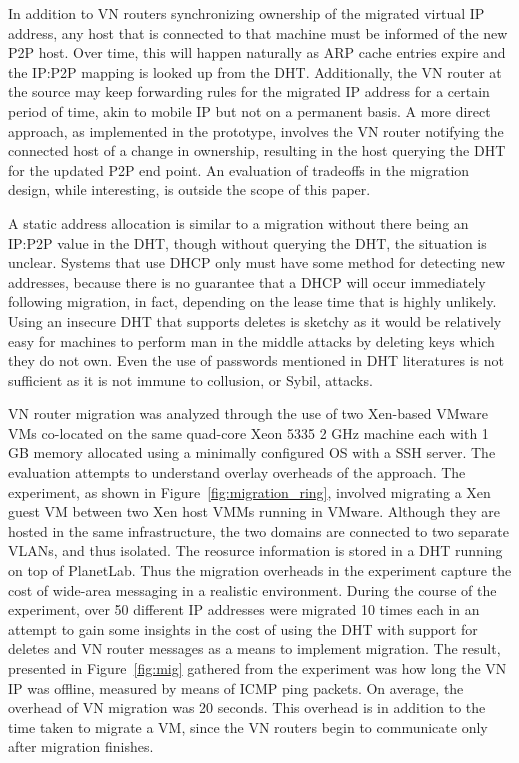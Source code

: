 In addition to VN routers synchronizing ownership of the migrated virtual
IP address, any host that is connected to that machine must be informed
of the new P2P host.  Over time, this will happen naturally as ARP cache
entries expire and the IP:P2P mapping is looked up from the DHT.  Additionally,
the VN router at the source may keep forwarding rules for the migrated IP
address for a certain period of time, akin to mobile IP but not on a permanent
basis.  A more direct approach, as implemented in the prototype, involves the VN
router notifying the connected host of a change in ownership, resulting in the
host querying the DHT for the updated P2P end point.  An evaluation of tradeoffs
in the migration design, while interesting, is outside the scope of this paper. 

A static address allocation is similar to a migration without there being an
IP:P2P value in the DHT, though without querying the DHT, the situation is
unclear.  Systems that use DHCP only must have some method for detecting new
addresses, because there is no guarantee that a DHCP will occur immediately
following migration, in fact, depending on the lease time that is highly
unlikely.  Using an insecure DHT that supports deletes is sketchy as it would
be relatively easy for machines to perform man in the middle attacks by
deleting keys which they do not own.  Even the use of passwords mentioned in
DHT literatures is not sufficient as it is not immune to collusion, or Sybil,
attacks.

VN router migration was analyzed through the use of two Xen-based VMware VMs
co-located on the same quad-core Xeon 5335 2 GHz machine each with 1 GB memory
allocated using a minimally configured OS with a SSH server.  The evaluation
attempts to understand overlay overheads of the approach.  The experiment, as
shown in Figure~\ref{fig:migration_ring}, involved migrating a Xen guest VM
between two Xen host VMMs running in VMware.  Although they are hosted in the
same infrastructure, the two domains are connected to two separate VLANs, and
thus isolated.  The reosurce information is stored in a DHT running on top of
PlanetLab.  Thus the migration overheads in the experiment capture the cost of
wide-area messaging in a realistic environment.  During the course of the
experiment, over 50 different IP addresses were migrated 10 times each in an
attempt to gain some insights in the cost of using the DHT with support for
deletes and VN router messages as a means to implement migration.  The result,
presented in Figure~\ref{fig:mig} gathered from the experiment was how long the
VN IP was offline, measured by means of ICMP ping packets.  On average, the
overhead of VN migration was 20 seconds. This overhead is in addition to the
time taken to migrate a VM, since the VN routers begin to communicate only
after migration finishes. 

